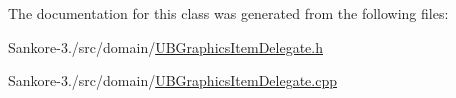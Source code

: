 The documentation for this class was generated from the following files\-:\begin{DoxyCompactItemize}
\item 
Sankore-\/3./src/domain/\hyperlink{_u_b_graphics_item_delegate_8h}{U\-B\-Graphics\-Item\-Delegate.\-h}\item 
Sankore-\/3./src/domain/\hyperlink{_u_b_graphics_item_delegate_8cpp}{U\-B\-Graphics\-Item\-Delegate.\-cpp}\end{DoxyCompactItemize}
